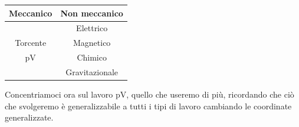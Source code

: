 \documentclass[
10pt, %
a4paper, %
oneside, %
headinclude,footinclude, %
BCOR5mm, %
]{scrartcl}
\begin{document}
\begin{table}[h!]
	\begin{center}
		\begin{tabular}{ || c| c ||}
			\hline
			Meccanico & Non meccanico\\
			\hline
			& Elettrico\\
			Torcente & Magnetico\\
			pV& Chimico\\
			& Gravitazionale\\
			\hline
		\end{tabular}
	\end{center}
\end{table}

Concentriamoci ora sul lavoro pV, quello che useremo di più, ricordando che ciò che svolgeremo è generalizzabile a tutti i tipi di lavoro cambiando le coordinate generalizzate.
\end{document}
